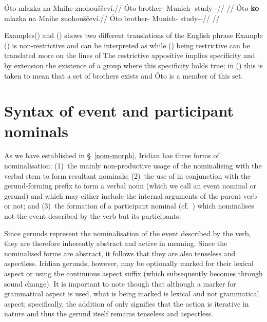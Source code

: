 \pex\a
\begingl{}
    \gla \'Oto mlazka na Mnihe znohouščeví.//
    \glb  \'Oto brother-\Dim{} \Loc{} Munich-\Acc{} study-\Av{}-\Cont{}//
    \glft {}//
\endgl
\a\begingl{}
    \gla \'Oto \textbf{ko} mlazka na Mnihe znohouščeví.//
    \glb  \'Oto \Lnk{} brother-\Dim{} \Loc{} Munich-\Acc{} study-\Av{}-\Cont{}//
    \glft {}//
\endgl
\xe

Examples() and () shows two different translations of the English phrase  Example () is non-restrictive and can be interpreted as  while () being restrictive can be translated more on the lines of  The restrictive appositive implies specificity and by extension the existence of a group where this specificity holds true; in () this is taken to mean that a set of brothers exists and \'Oto is a member of this set.


\section{Syntax of event and participant nominals}\label{sec:nomz-syntax}

As we have established in \S~\ref{nom-morph}, Iridian has three forms of nominalisation: (1)~the mainly non-productive usage of the nominalising  with the verbal stem to form resultant nominals; (2)~the use of  in conjunction with the gerund-forming prefix  to form a verbal noun (which we call an event nominal or gerund) and which may either include the internal arguments of the parent verb or not; and (3)~the formation of a participant nominal (cf.~\cite{okuna}) which nominalises not the event described by the verb but its participants.

Since gerunds represent the nominalisation of the event described by the verb, they are therefore inherently abstract and active in meaning. Since the nominalised forms are abstract, it follows that they are also tenseless and aspectless. Iridian gerunds, however, may be optionally marked for their lexical aspect or  using the continuous aspect suffix  (which subsequently becomes  through sound change). It is important to note though that although a marker for grammatical aspect is used, what is being marked is lexical and not grammatical aspect; specifically, the addition of  only signifies that the action is iterative in nature and thus the gerund itself remains tenseless and aspectless.

